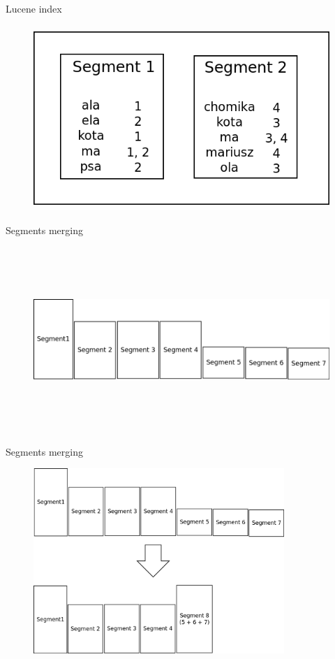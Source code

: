 \documentclass{beamer}
\begin{document}
\begin{frame}{Lucene index}
	\begin{figure}
		\includegraphics[width=\textwidth,height=7cm,keepaspectratio=true]{lucene-index}
	\end{figure}
\end{frame}
\begin{frame}{Segments merging}
	\begin{figure}
		\includegraphics[width=\textwidth,height=7cm,keepaspectratio=true]{segments}
	\end{figure}
\end{frame}
\begin{frame}{Segments merging}
	\begin{figure}
		\includegraphics[width=\textwidth,height=7cm,keepaspectratio=true]{segments-merging}
	\end{figure}
\end{frame}
\end{document}
